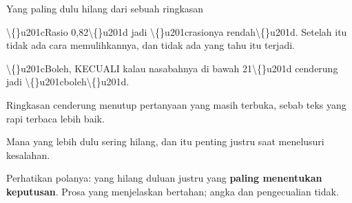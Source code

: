 \documentclass[aspectratio=169,11pt,t]{beamer}
\begin{document}
\begin{frame}[shrink=25]{Yang paling dulu hilang dari sebuah ringkasan}
\begin{minipage}[t]{0.494\textwidth}
\begin{icardbad}
\textbackslash\{\}u201cRasio 0,82\textbackslash\{\}u201d jadi \textbackslash\{\}u201crasionya rendah\textbackslash\{\}u201d. Setelah itu tidak ada cara memulihkannya, dan tidak ada yang tahu itu terjadi.
\end{icardbad}
\end{minipage}%
\hfill
\begin{minipage}[t]{0.494\textwidth}
\begin{icardbad}
\textbackslash\{\}u201cBoleh, KECUALI kalau nasabahnya di bawah 21\textbackslash\{\}u201d cenderung jadi \textbackslash\{\}u201cboleh\textbackslash\{\}u201d.
\end{icardbad}
\end{minipage}%


\vskip 4pt

\begin{minipage}[t]{0.494\textwidth}
\begin{icard}
Ringkasan cenderung menutup pertanyaan yang masih terbuka, sebab teks yang rapi terbaca lebih baik.
\end{icard}
\end{minipage}%
\hfill
\begin{minipage}[t]{0.494\textwidth}
\begin{icard}
Mana yang lebih dulu sering hilang, dan itu penting justru saat menelusuri kesalahan.
\end{icard}
\end{minipage}%
{\fontsize{9.4}{12.6}\selectfont\color{fg2}Perhatikan polanya: yang hilang duluan justru yang \textbf{paling menentukan keputusan}. Prosa yang menjelaskan bertahan; angka dan pengecualian tidak.\par}\vskip 4pt
\end{frame}
\end{document}
